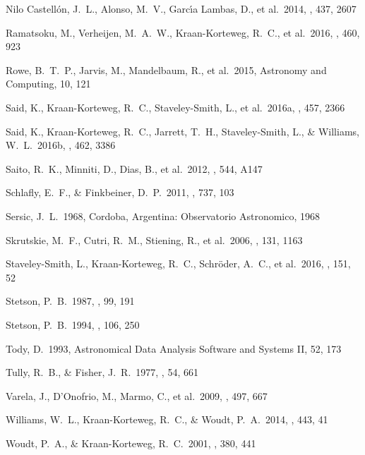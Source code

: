 \documentclass[preprint2]{aastex}
\begin{document}
\begin{thebibliography}{}
    Nilo Castell{\'o}n, J.~L., Alonso, M.~V., Garc{\'{\i}}a Lambas, D., et al.\ 2014, \mnras, 437, 2607 

    Ramatsoku, M., Verheijen, M.~A.~W., Kraan-Korteweg, R.~C., et al.\ 2016, \mnras, 460, 923

      Rowe, B.~T.~P., Jarvis, M., Mandelbaum, R., et al.\ 2015, Astronomy and Computing, 10, 121

     Said, K., Kraan-Korteweg, R.~C., Staveley-Smith, L., et al.\ 2016a, \mnras, 457, 2366 

   Said, K., Kraan-Korteweg, R.~C., Jarrett, T.~H., Staveley-Smith, L., \& Williams, W.~L.\ 2016b, \mnras, 462, 3386 

    Saito, R.~K., Minniti, D., Dias, B., et al.\ 2012, \aap, 544, A147   
     
    Schlafly, E.~F., \& Finkbeiner, D.~P.\ 2011, \apj, 737, 103 

      Sersic, J.~L.\ 1968, Cordoba, Argentina: Observatorio Astronomico, 1968
     
    Skrutskie, M.~F., Cutri, R.~M., Stiening, R., et al.\ 2006, \aj, 131, 1163 
   
    Staveley-Smith, L., Kraan-Korteweg, R.~C., Schr{\"o}der, A.~C., et al.\ 2016, \aj, 151, 52 

    Stetson, P.~B.\ 1987, \pasp, 99, 191
   
    Stetson, P.~B.\ 1994, \pasp, 106, 250

      Tody, D.\ 1993, Astronomical Data Analysis Software and Systems II, 52, 173 

    Tully, R.~B., \& Fisher, J.~R.\ 1977, \aap, 54, 661
     
    Varela, J., D'Onofrio, M., Marmo, C., et al.\ 2009, \aap, 497, 667

      Williams, W.~L., Kraan-Korteweg, R.~C., \& Woudt, P.~A.\ 2014, \mnras, 443, 41 

    Woudt, P.~A., \& Kraan-Korteweg, R.~C.\ 2001, \aap, 380, 441 
        

\end{thebibliography}
\end{document}
